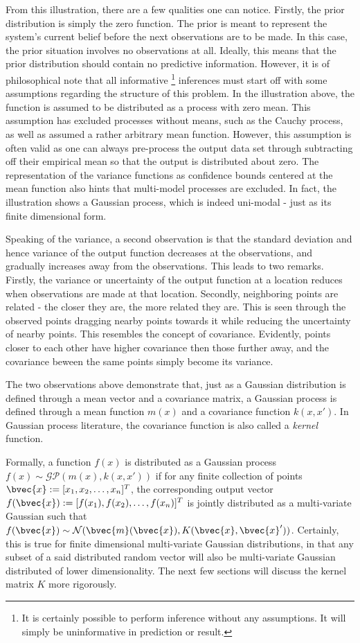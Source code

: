 			From this illustration, there are a few qualities one can notice. Firstly, the prior distribution is simply the zero function. The prior is meant to represent the system's current belief before the next observations are to be made. In this case, the prior situation involves no observations at all. Ideally, this means that the prior distribution should contain no predictive information. However, it is of philosophical note that all informative \footnote{It is certainly possible to perform inference without any assumptions. It will simply be uninformative in prediction or result.} inferences must start off with some assumptions regarding the structure of this problem. In the illustration above, the function is assumed to be distributed as a process with zero mean. This assumption has excluded processes without means, such as the Cauchy process, as well as assumed a rather arbitrary mean function. However, this assumption is often valid as one can always pre-process the output data set through subtracting off their empirical mean so that the output is distributed about zero. The representation of the variance functions as confidence bounds centered at the mean function also hints that multi-model processes are excluded. In fact, the illustration shows a Gaussian process, which is indeed uni-modal - just as its finite dimensional form.
			
			Speaking of the variance, a second observation is that the standard deviation and hence variance of the output function decreases at the observations, and gradually increases away from the observations. This leads to two remarks. Firstly, the variance or uncertainty of the output function at a location reduces when observations are made at that location. Secondly, neighboring points are related - the closer they are, the more related they are. This is seen through the observed points dragging nearby points towards it while reducing the uncertainty of nearby points. This resembles the concept of covariance. Evidently, points closer to each other have higher covariance then those further away, and the covariance beween the same points simply become its variance.
			
			The two observations above demonstrate that, just as a Gaussian distribution is defined through a mean vector and a covariance matrix, a Gaussian process is defined through a mean function $m(x)$ and a covariance function $k(x, x')$. In Gaussian process literature, the covariance function is also called a \textit{kernel} function.
			
			Formally, a function $f(x)$ is distributed as a Gaussian process $f(x) \sim \mathcal{GP}(m(x), k(x, x'))$ if for any finite collection of points $\bvec{x} := [x_{1}, x_{2}, \dots, x_{n}]^{T}$, the corresponding output vector $f(\bvec{x}) := [f(x_{1}), f(x_{2}), \dots, f(x_{n})]^{T}$ is jointly distributed as a multi-variate Gaussian such that $f(\bvec{x}) \sim \mathcal{N}(\bvec{m}(\bvec{x}), K(\bvec{x}, \bvec{x}'))$. Certainly, this is true for finite dimensional multi-variate Gaussian distributions, in that any subset of a said distributed random vector will also be multi-variate Gaussian distributed of lower dimensionality. The next few sections will discuss the kernel matrix $K$ more rigorously.
			
